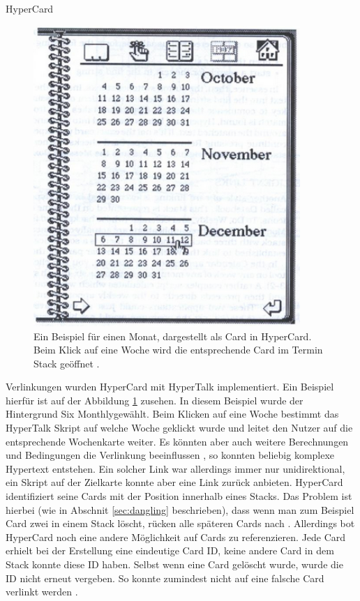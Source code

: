 \begin{section}{HyperCard}
\begin{figure}[!ht]
	\centering
	\includegraphics[width=0.9\textwidth]{image/hypercardLink}
	\caption{Ein Beispiel für einen Monat, dargestellt als Card in HyperCard. Beim Klick auf eine Woche wird die entsprechende Card im Termin Stack geöffnet \cite{Goodman1988}.}
	\label{fig:hypercardLink}
\end{figure}

Verlinkungen wurden HyperCard mit HyperTalk implementiert. Ein Beispiel hierfür ist auf der Abbildung \ref{fig:hypercardLink} zusehen. In diesem Beispiel wurde der Hintergrund \glqq Six Monthly\grqq{ }gewählt. Beim Klicken auf eine Woche bestimmt das HyperTalk Skript auf welche Woche geklickt wurde und leitet den Nutzer auf die entsprechende Wochenkarte weiter. Es könnten aber auch weitere Berechnungen und Bedingungen die Verlinkung beeinflussen \cite{Goodman1988}, so konnten beliebig komplexe Hypertext entstehen. Ein solcher Link war allerdings immer nur unidirektional, ein Skript auf der Zielkarte konnte aber eine Link zurück anbieten. HyperCard identifiziert seine Cards mit der Position innerhalb eines Stacks. Das Problem ist hierbei (wie in Abschnit \ref{sec:dangling} beschrieben), dass wenn man zum Beispiel Card zwei in einem Stack löscht, rücken alle späteren Cards nach \cite{Goodman1988}. Allerdings bot HyperCard noch eine andere Möglichkeit auf Cards zu referenzieren. Jede Card erhielt bei der Erstellung eine eindeutige Card ID, keine andere Card in dem Stack konnte diese ID haben. Selbst wenn eine Card gelöscht wurde, wurde die ID nicht erneut vergeben. So konnte zumindest nicht auf eine falsche Card verlinkt werden \cite{Goodman1988}.

\end{section}